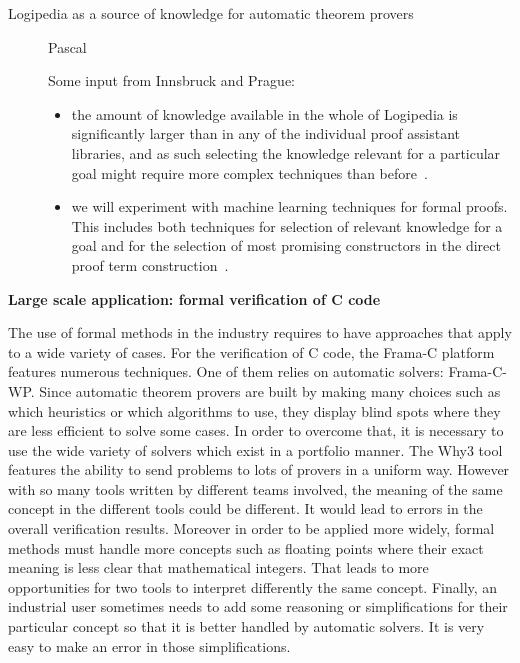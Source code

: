 \begin{description}
\item[Logipedia as a source of knowledge for automatic theorem provers]
  Pascal

Some input from Innsbruck and Prague:
\begin{itemize}
\item the amount of knowledge available in the whole of Logipedia is
  significantly larger than in any of the individual proof assistant
  libraries, and as such selecting the knowledge relevant for a
  particular goal might require more complex techniques than
  before~\cite{Irving-deepmath}.
\item we will experiment with machine learning techniques for formal
  proofs. This includes both techniques for selection of relevant
  knowledge for a goal and for the selection of most promising
  constructors in the direct proof term
  construction~\cite{ZielenkiewiczSchubert2016}.
\end{itemize}


\end{description}


\noindent
{\bf \large Large scale application: formal verification of C code}

The use of formal methods in the industry requires to have approaches
that apply to a wide variety of cases. For the verification of C code,
the Frama-C platform features numerous techniques. One of them relies on
automatic solvers: Frama-C-WP. Since automatic theorem provers are built by making many
choices such as which heuristics or which algorithms to use, they
display blind spots where they are less efficient to solve some cases.
In order to overcome that, it is necessary to use the wide variety of
solvers which exist in a portfolio manner. The Why3 tool features the
ability to send problems to lots of provers in a uniform way. However
with so many tools written by different teams involved, the meaning of
the same concept in the different tools could be different. It would
lead to errors in the overall verification results. Moreover in order to
be applied more widely, formal methods must handle more concepts such as
floating points where their exact meaning is less clear that
mathematical integers. That leads to more opportunities for two tools to
interpret differently the same concept. Finally, an industrial user
sometimes needs to add some reasoning or simplifications for their
particular concept so that it is better handled by automatic solvers. It
is very easy to make an error in those simplifications.

